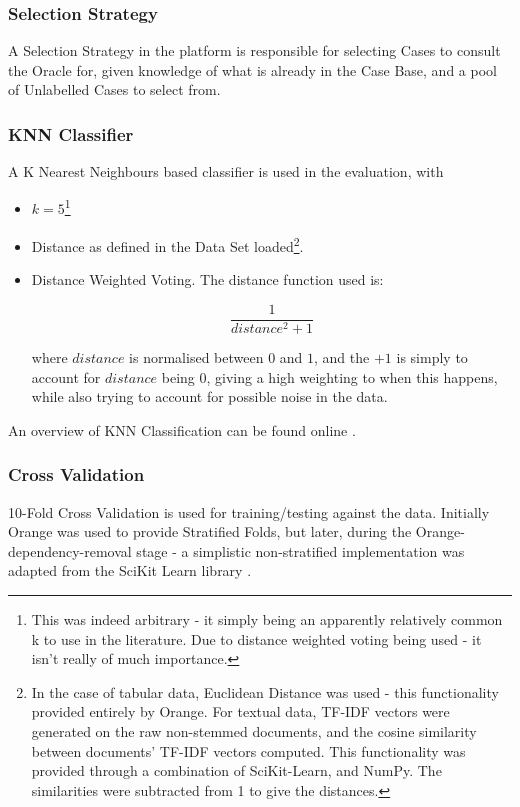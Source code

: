 \documentclass[a4paper,11pt]{report}
\begin{document}
\subsubsection{Selection Strategy}

A Selection Strategy in the platform is responsible for selecting Cases to consult the Oracle for, given knowledge of what is already in the Case Base, and a pool of Unlabelled Cases to select from.

\subsubsection{KNN Classifier}
A K Nearest Neighbours based classifier is used in the evaluation, with 
\begin{itemize}
	\item $k=5$\footnote{This was indeed arbitrary - it simply being an apparently relatively common k to use in the literature. Due to distance weighted voting being used - it isn't really of much importance.} 
	\item Distance as defined in the Data Set loaded\footnote {In the case of tabular data, Euclidean Distance was used - this functionality provided entirely by Orange. For textual data, TF-IDF vectors were generated on the raw non-stemmed documents, and the cosine similarity between documents' TF-IDF vectors computed. This functionality was provided through a combination of SciKit-Learn, and NumPy. The similarities were subtracted from 1 to give the distances. }.
	\item Distance Weighted Voting. The distance function used is:
	
	\[
	\frac{1}{distance^{2}+1}
	\]
	
	where $distance$ is normalised between $0$ and $1$, and the $+1$ is simply to account for $distance$ being $0$, giving a high weighting to when this happens, while also trying to account for possible noise in the data.
	
	
\end{itemize}

An overview of KNN Classification can be found online \citep{web:knntut}.

\subsubsection{Cross Validation}

10-Fold Cross Validation is used for training/testing against the data. Initially Orange was used to provide Stratified Folds, but later, during the Orange-dependency-removal stage - a simplistic non-stratified implementation was adapted from the SciKit Learn library \citep{prog:sklearn}.
\end{document}
